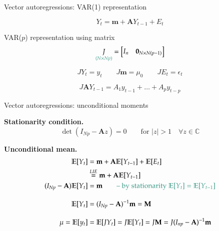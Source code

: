 \documentclass[notes,blackandwhite,mathsans,usenames,dvipsnames]{beamer}
\begin{document}
\begin{frame}{Vector autoregressions: VAR(1) representation}

$$ Y_t = \mathbf{m} + \mathbf{A} Y_{t-1} + E_t $$

 VAR($p$) {\color{mcxs2}representation using matrix}
$$ \underset{\color{mcxs2}(N\times Np)}{J} = \begin{bmatrix} I_n & \mathbf{0}_{N\times N(p-1)} \end{bmatrix} $$

\bigskip$$ JY_t = y_t \qquad J\mathbf{m} = \mu_0 \qquad  JE_t = \epsilon_t $$

$$ J\mathbf{A} Y_{t-1} = A_1 y_{t-1} + \dots + A_p y_{t-p} $$

\end{frame}


\begin{frame}{Vector autoregressions: unconditional moments}

\textbf{Stationarity condition.}
$$ \det(I_{Np} - \mathbf{A}z) = 0 \qquad\text{for } |z|>1 \quad\forall z\in\mathbb{C} $$


\bigskip\textbf{Unconditional mean.}
\begin{align*}
\mathbb{E}[Y_t] &= \mathbf{m} + \mathbf{A} \mathbb{E}[Y_{t-1}] + \mathbb{E}[E_t]\\
&\overset{LIE}{=} \mathbf{m} + \mathbf{A} \mathbb{E}[Y_{t-1}] \\
(I_{Np} - \mathbf{A})\mathbb{E}[Y_t] &= \mathbf{m} \qquad{\color{mcxs2}\text{-- by stationarity }\mathbb{E}[Y_t] = \mathbb{E}[Y_{t-1}]}\\[2ex]
\mathbb{E}[Y_t] &= (I_{Np} - \mathbf{A})^{-1}\mathbf{m} = \mathbf{M}\\[2ex]
\mu = \mathbb{E}[y_t] &= \mathbb{E}[JY_t]= J\mathbb{E}[Y_t]= J\mathbf{M} = J(I_{np} - \mathbf{A})^{-1}\mathbf{m}
\end{align*}

\end{frame}
\end{document}
